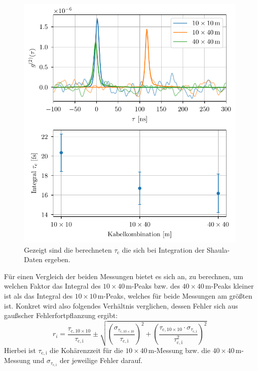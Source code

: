 \begin{figure}[H]
    \centering
    \includegraphics{images/Analysis/Shaula_combined.pdf}
    \caption{Gezeigt sind die berechneten $\tau_{\mathrm{c}}$ die sich bei Integration der Shaula-Daten ergeben.}
    \label{fig:integration shaula}
\end{figure}
Für einen Vergleich der beiden Messungen bietet es sich an, zu berechnen, um welchen Faktor das Integral des $10\times 40\,\mathrm{m}$-Peaks bzw. des $40\times 40\,\mathrm{m}$-Peaks kleiner ist als das Integral des $10\times 10\,\mathrm{m}$-Peaks, welches für beide Messungen am größten ist. 
Konkret wird also folgendes Verhältnis verglichen, dessen Fehler sich aus gaußscher Fehlerfortpflanzung ergibt:
\begin{equation}
    r_i = \frac{\tau_{\mathrm{c,10\times10}}}{\tau_{\mathrm{c,i}}} \pm \sqrt{\left(\frac{\sigma_{\tau_\mathrm{{c,10\times10}}}}{\tau_{\mathrm{c,i}}}\right)^2 + \left(\frac{\tau_{\mathrm{c,10\times10}} \cdot \sigma_{\tau_{\mathrm{c,i}}}}{\tau_{\mathrm{c,i}}^2}\right)^2}
\end{equation}
Hierbei ist $\tau_{\mathrm{c,i}}$ die Kohärenzzeit für die $10\times 40\,\mathrm{m}$-Messung bzw. die $40\times 40\,\mathrm{m}$-Messung und $\sigma_{\tau_{\mathrm{c,i}}}$ der jeweilige Fehler darauf. 
